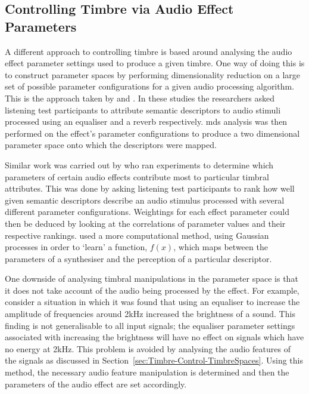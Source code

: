 	\subsection{Controlling Timbre via Audio Effect Parameters}
	\label{sec:Timbre-Control-ParameterSpaces}
		A different approach to controlling timbre is based around analysing the audio effect parameter settings
		used to produce a given timbre. One way of doing this is to construct parameter spaces by performing
		dimensionality reduction on a large set of possible parameter configurations for a given audio processing
		algorithm. This is the approach taken by \citet{cartwright2013socialeq} and
		\citet{seetharaman2014crowdsourcing}. In these studies the researchers asked listening test participants to
		attribute semantic descriptors to audio stimuli processed using an equaliser and a reverb respectively.
		\acrshort{mds} analysis was then performed on the effect's parameter configurations to produce a two
		dimensional parameter space onto which the descriptors were mapped.

		Similar work was carried out by \citet{sabin2011weighting} who ran experiments to determine which
		parameters of certain audio effects contribute most to particular timbral attributes. This was done by
		asking listening test participants to rank how well given semantic descriptors describe an audio stimulus
		processed with several different parameter configurations. Weightings for each effect parameter could then
		be deduced by looking at the correlations of parameter values and their respective rankings.
		\citet{huang2014active} used a more computational method, using Gaussian processes in order to `learn' a
		function, $f(x)$, which maps between the parameters of a synthesiser and the perception of a particular
		descriptor.

		One downside of analysing timbral manipulations in the parameter space is that it does not take account of
		the audio being processed by the effect. For example, consider a situation in which it was found that using
		an equaliser to increase the amplitude of frequencies around 2kHz increased the brightness of a sound. This
		finding is not generalisable to all input signals; the equaliser parameter settings associated with
		increasing the brightness will have no effect on signals which have no energy at 2kHz. This problem is
		avoided by analysing the audio features of the signals as discussed in
		Section~\ref{sec:Timbre-Control-TimbreSpaces}. Using this method, the necessary audio feature manipulation
		is determined and then the parameters of the audio effect are set accordingly.


